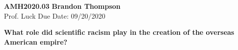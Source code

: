 \noindent
\textbf{AMH2020.03} \hfill \textbf{Brandon Thompson} \\
\normalsize Prof. Luck \hfill Due Date: 09/20/2020 \\

\begin{center}
\textbf{What role did scientific racism play in the creation of the overseas American empire?}
\end{center}
